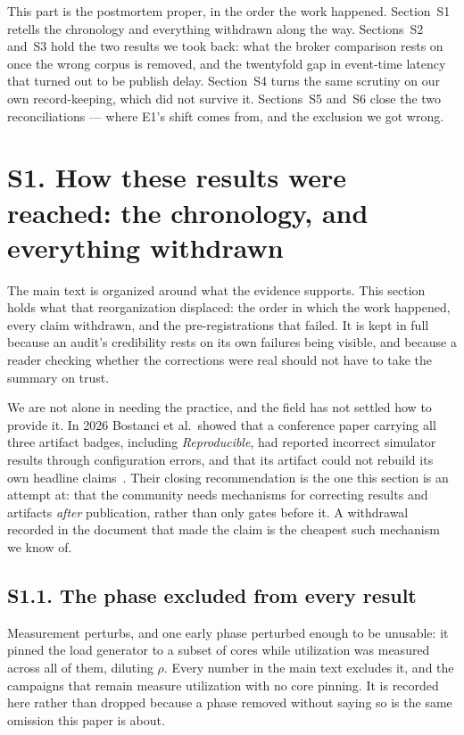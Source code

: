 \documentclass[10pt,journal,onecolumn]{IEEEtran}
\begin{document}
This part is the postmortem proper, in the order the work happened. Section~S1 retells the chronology and everything withdrawn along the way. Sections~S2 and~S3 hold the two results we took back: what the broker comparison rests on once the wrong corpus is removed, and the twentyfold gap in event-time latency that turned out to be publish delay. Section~S4 turns the same scrutiny on our own record-keeping, which did not survive it. Sections~S5 and~S6 close the two reconciliations --- where E1's shift comes from, and the exclusion we got wrong.

\section{S1. How these results were reached: the chronology, and everything withdrawn}

The main text is organized around what the evidence supports. This section holds what that
reorganization displaced: the order in which the work happened, every claim withdrawn, and
the pre-registrations that failed. It is kept in full because an audit's credibility rests on
its own failures being visible, and because a reader checking whether the corrections were
real should not have to take the summary on trust.

We are not alone in needing the practice, and the field has not settled how to provide it. In
2026 Bostanci et al.\ showed that a conference paper carrying all three artifact badges,
including \emph{Reproducible}, had reported incorrect simulator results through configuration
errors, and that its artifact could not rebuild its own headline
claims~\cite{bostanci2026ramulator}. Their closing recommendation is the one this section is an
attempt at: that the community needs mechanisms for correcting results and artifacts
\emph{after} publication, rather than only gates before it. A withdrawal recorded in the
document that made the claim is the cheapest such mechanism we know of.

\subsection{S1.1. The phase excluded from every result}

Measurement perturbs, and one early phase perturbed enough to be unusable: it pinned the load
generator to a subset of cores while utilization was measured across all of them, diluting
$\rho$. Every number in the main text excludes it, and the campaigns that remain measure
utilization with no core pinning. It is recorded here rather than dropped because a phase
removed without saying so is the same omission this paper is about.
\end{document}
